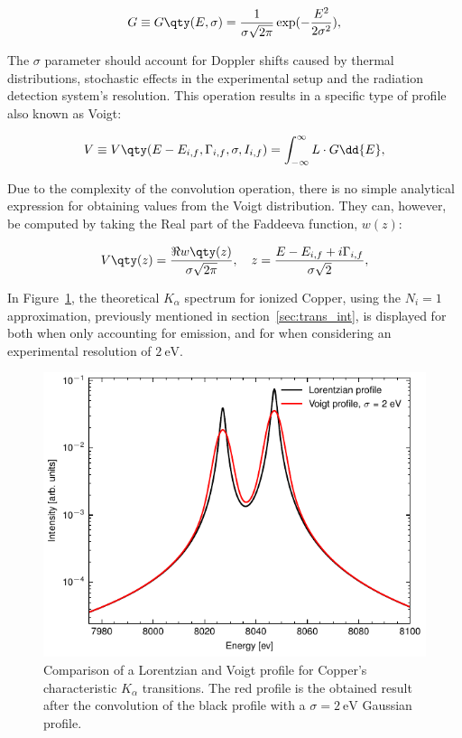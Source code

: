 \begin{equation}
    G\equiv G\qty(E,\sigma)=\frac{1}{\sigma\sqrt{2\pi}}\exp(-\frac{E^2}{2\sigma^2}),
    \label{eq:Gaussian}
\end{equation}

The $\sigma$ parameter should account for Doppler shifts caused by thermal distributions, stochastic effects in the experimental setup and the radiation detection system's resolution. This operation results in a specific type of profile also known as Voigt:

\begin{equation}
    V\equiv V\qty(E-E_{i,f},\Gamma_{i,f},\sigma,I_{i,f})=\int_{-\infty}^{\infty} L\cdot G\dd{E},
\end{equation}

Due to the complexity of the convolution operation, there is no simple analytical expression for obtaining values from the Voigt distribution. They can, however, be computed by taking the Real part of the Faddeeva function, $w(z)$:

\begin{equation}
    V\qty(z)= \frac{\Re{w\qty(z)}}{\sigma\sqrt{2\pi}},\quad z=\frac{E-E_{i,f} + i\Gamma_{i,f}}{\sigma\sqrt{2}},
\end{equation}

In Figure~\ref{fig:Lor_Voigt}, the theoretical $K_\alpha$ spectrum for ionized Copper, using the $N_i=1$ approximation, previously mentioned in section~\ref{sec:trans_int}, is displayed for both when only accounting for emission, and for when considering an experimental resolution of $2\ \si{\electronvolt}$.

\begin{figure}[h!]
    \centering
    \includegraphics[width=.6\linewidth]{Chapters/Figures/Chapter4/K_lorentz_voigt.pdf}
    \caption{Comparison of a Lorentzian and Voigt profile for Copper's characteristic $K_{\alpha}$ transitions. The red profile is the obtained result after the convolution of the black profile with a $\sigma=2\ \si{\electronvolt}$ Gaussian profile.}\label{fig:Lor_Voigt}
\end{figure}


